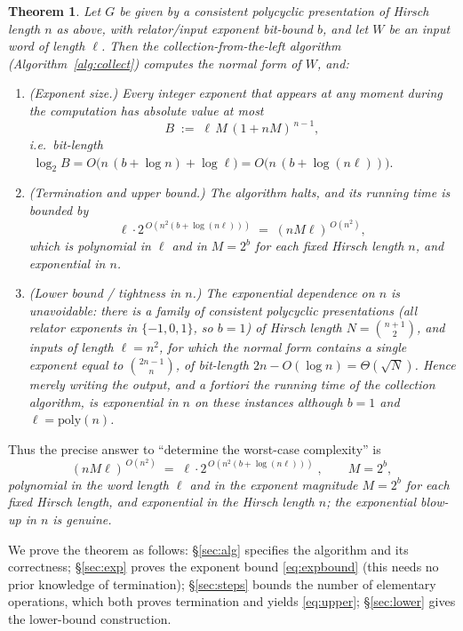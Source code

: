 \documentclass{amsart}
\newtheorem{theorem}{Theorem}
\theoremstyle{definition}
\begin{document}
\begin{theorem}\label{thm:main}
Let $G$ be given by a consistent polycyclic presentation of Hirsch length $n$ as above,
with relator/input exponent bit-bound $b$, and let $W$ be an input word of length $\ell$.
Then the collection-from-the-left algorithm \textup{(}Algorithm~\textup{\ref{alg:collect})}
computes the normal form of $W$, and:
\begin{enumerate}
\item \textup{(Exponent size.)} Every integer exponent that appears at any moment during the
computation has absolute value at most
\begin{equation}\label{eq:expbound}
B \;:=\; \ell\,M\,(1+nM)^{\,n-1},
\end{equation}
i.e.\ bit-length $\;\log_2 B=O\!\bigl(n\,(b+\log n)+\log\ell\bigr)=O\!\bigl(n\,(b+\log(n\ell))\bigr).$
\item \textup{(Termination and upper bound.)} The algorithm halts, and its running time is
bounded by
\begin{equation}\label{eq:upper}
\ell\cdot 2^{\,O\!\left(n^2(b+\log(n\ell))\right)}\;=\;(nM\ell)^{\,O(n^2)},
\end{equation}
which is polynomial in $\ell$ and in $M=2^{b}$ for each fixed Hirsch length $n$, and
exponential in $n$.
\item \textup{(Lower bound / tightness in $n$.)} The exponential dependence on $n$ is
unavoidable: there is a family of consistent polycyclic presentations \textup{(}all relator
exponents in $\{-1,0,1\}$, so $b=1$\textup{)} of Hirsch length $N=\binom{n+1}{2}$, and inputs
of length $\ell=n^2$, for which the normal form contains a single exponent equal to
$\binom{2n-1}{n}$, of bit-length $2n-O(\log n)=\Theta(\sqrt N)$. Hence merely writing the
output, and a fortiori the running time of the collection algorithm, is exponential in $n$ on
these instances although $b=1$ and $\ell=\mathrm{poly}(n)$.
\end{enumerate}
\end{theorem}

\noindent
Thus the precise answer to ``determine the worst-case complexity'' is
\[
\boxed{\;(nM\ell)^{\,O(n^2)}\;=\;\ell\cdot 2^{\,O(n^2(b+\log(n\ell)))}\;,\qquad M=2^{b},\;}
\]
\emph{polynomial in the word length $\ell$ and in the exponent magnitude $M=2^{b}$ for each
fixed Hirsch length, and exponential in the Hirsch length $n$; the exponential blow-up in $n$
is genuine.}

\medskip
We prove the theorem as follows: \S\ref{sec:alg} specifies the algorithm and its correctness;
\S\ref{sec:exp} proves the exponent bound \eqref{eq:expbound} (this needs no prior knowledge
of termination); \S\ref{sec:steps} bounds the number of elementary operations, which both
proves termination and yields \eqref{eq:upper}; \S\ref{sec:lower} gives the lower-bound
construction.
\end{document}
